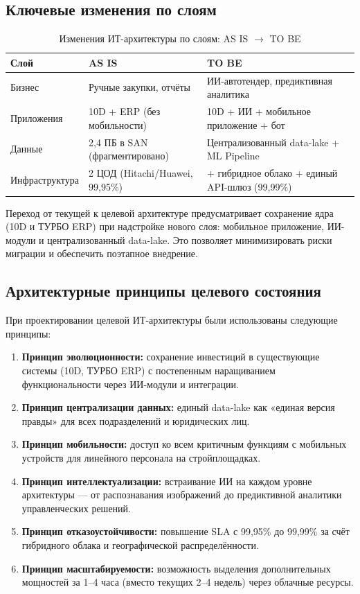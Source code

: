 \documentclass[12pt,a4paper]{article}
\begin{document}
\subsection{Ключевые изменения по слоям}

\begin{table}[H]
\centering
\caption{Изменения ИТ-архитектуры по слоям: AS IS $\to$ TO BE}
\label{tab:layers_change}
\small
\begin{tabularx}{\textwidth}{|l|X|X|}
\hline
\rowcolor{samoletlight}
\textbf{Слой} & \textbf{AS IS} & \textbf{TO BE} \\
\hline
Бизнес & Ручные закупки, отчёты & ИИ-автотендер, предиктивная аналитика \\
\hline
Приложения & 10D + ERP (без мобильности) & 10D + ИИ + мобильное приложение + бот \\
\hline
Данные & 2,4 ПБ в SAN (фрагментировано) & Централизованный data-lake + ML Pipeline \\
\hline
Инфраструктура & 2 ЦОД (Hitachi/Huawei, 99,95\%) & + гибридное облако + единый API-шлюз (99,99\%) \\
\hline
\end{tabularx}
\end{table}

Переход от текущей к целевой архитектуре предусматривает сохранение ядра (10D и ТУРБО ERP) при надстройке нового слоя: мобильное приложение, ИИ-модули и централизованный data-lake. Это позволяет минимизировать риски миграции и обеспечить поэтапное внедрение.

\subsection{Архитектурные принципы целевого состояния}

При проектировании целевой ИТ-архитектуры были использованы следующие принципы:

\begin{enumerate}[leftmargin=20pt]
  \item \textbf{Принцип эволюционности:} сохранение инвестиций в существующие системы (10D, ТУРБО ERP) с постепенным наращиванием функциональности через ИИ-модули и интеграции.
  \item \textbf{Принцип централизации данных:} единый data-lake как «единая версия правды» для всех подразделений и юридических лиц.
  \item \textbf{Принцип мобильности:} доступ ко всем критичным функциям с мобильных устройств для линейного персонала на стройплощадках.
  \item \textbf{Принцип интеллектуализации:} встраивание ИИ на каждом уровне архитектуры --- от распознавания изображений до предиктивной аналитики управленческих решений.
  \item \textbf{Принцип отказоустойчивости:} повышение SLA с 99,95\% до 99,99\% за счёт гибридного облака и географической распределённости.
  \item \textbf{Принцип масштабируемости:} возможность выделения дополнительных мощностей за 1--4 часа (вместо текущих 2--4 недель) через облачные ресурсы.
\end{enumerate}
\end{document}
